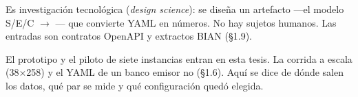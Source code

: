 Es investigación tecnológica (\textit{design science}): se diseña un artefacto ---el modelo
S/E/C $\rightarrow$ \AlignmentScore{}--- que convierte YAML en números. No hay sujetos humanos.
Las entradas son contratos OpenAPI y extractos BIAN (§1.9).

El prototipo y el piloto de siete instancias entran en esta tesis. La corrida a escala
(38$\times$258) y el YAML de un banco emisor no (§1.6). Aquí se dice de dónde salen los datos,
qué par se mide y qué configuración quedó elegida.
